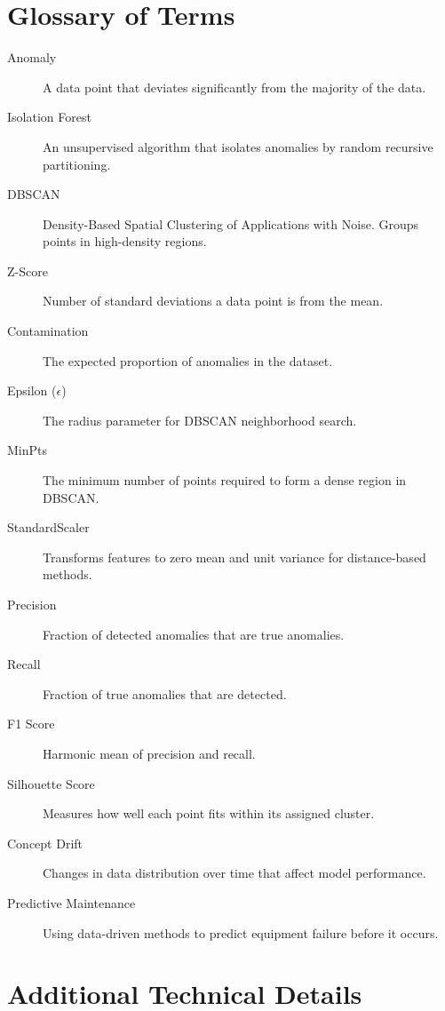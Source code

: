 \documentclass[12pt,a4paper]{report}
\begin{document}
\chapter{Glossary of Terms}
\label{ch:glossary}

\begin{description}
    \item[Anomaly] A data point that deviates significantly from the majority of the data.
    \item[Isolation Forest] An unsupervised algorithm that isolates anomalies by random recursive partitioning.
    \item[DBSCAN] Density-Based Spatial Clustering of Applications with Noise. Groups points in high-density regions.
    \item[Z-Score] Number of standard deviations a data point is from the mean.
    \item[Contamination] The expected proportion of anomalies in the dataset.
    \item[Epsilon ($\epsilon$)] The radius parameter for DBSCAN neighborhood search.
    \item[MinPts] The minimum number of points required to form a dense region in DBSCAN.
    \item[StandardScaler] Transforms features to zero mean and unit variance for distance-based methods.
    \item[Precision] Fraction of detected anomalies that are true anomalies.
    \item[Recall] Fraction of true anomalies that are detected.
    \item[F1 Score] Harmonic mean of precision and recall.
    \item[Silhouette Score] Measures how well each point fits within its assigned cluster.
    \item[Concept Drift] Changes in data distribution over time that affect model performance.
    \item[Predictive Maintenance] Using data-driven methods to predict equipment failure before it occurs.
\end{description}

\chapter{Additional Technical Details}
\label{ch:technical_details}
\end{document}
